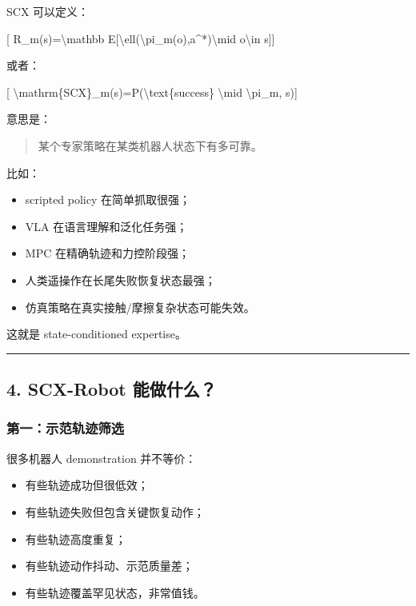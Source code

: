 \documentclass[
  12pt,
]{ctexart}
\providecommand{\tightlist}{%
  \setlength{\itemsep}{0pt}\setlength{\parskip}{0pt}}
\begin{document}
SCX 可以定义：

{[} R\_m(s)=\textbackslash mathbb
E{[}\textbackslash ell(\textbackslash pi\_m(o),a\^{}*)\textbackslash mid
o\textbackslash in s{]}{]}

或者：

{[} \textbackslash mathrm\{SCX\}\_m(s)=P(\textbackslash text\{success\}
\textbackslash mid \textbackslash pi\_m, s){]}

意思是：

\begin{quote}
某个专家策略在某类机器人状态下有多可靠。
\end{quote}

比如：

\begin{itemize}
\tightlist
\item
  scripted policy 在简单抓取很强；
\item
  VLA 在语言理解和泛化任务强；
\item
  MPC 在精确轨迹和力控阶段强；
\item
  人类遥操作在长尾失败恢复状态最强；
\item
  仿真策略在真实接触/摩擦复杂状态可能失效。
\end{itemize}

这就是 state-conditioned expertise。

\begin{center}\rule{0.5\linewidth}{0.5pt}\end{center}

\subsection{4. SCX-Robot
能做什么？}\label{scx-robot-ux80fdux505aux4ec0ux4e48}

\subsubsection{第一：示范轨迹筛选}\label{ux7b2cux4e00ux793aux8303ux8f68ux8ff9ux7b5bux9009}

很多机器人 demonstration 并不等价：

\begin{itemize}
\tightlist
\item
  有些轨迹成功但很低效；
\item
  有些轨迹失败但包含关键恢复动作；
\item
  有些轨迹高度重复；
\item
  有些轨迹动作抖动、示范质量差；
\item
  有些轨迹覆盖罕见状态，非常值钱。
\end{itemize}
\end{document}
